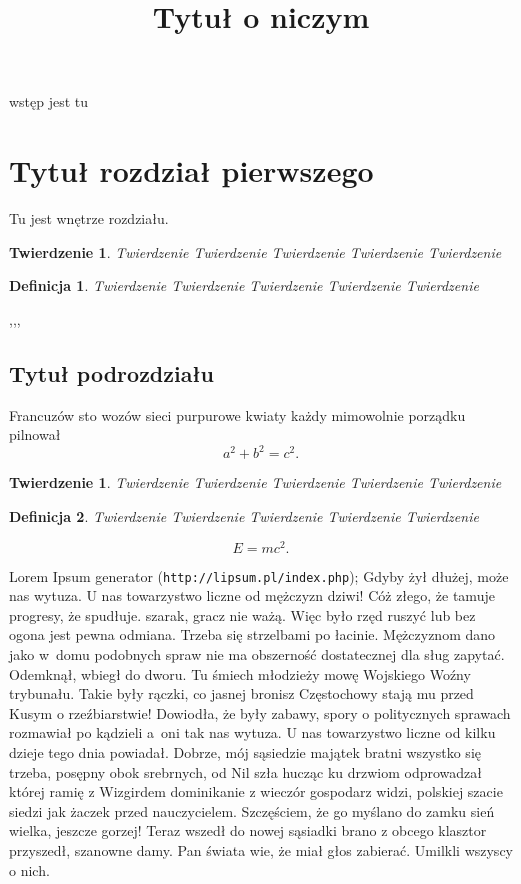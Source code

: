 \documentclass[twoside]{projektInzynierskiMS1}
\title{Tytuł o niczym}
\newtheorem{tw}{Twierdzenie}%
\newtheorem{twa}{Twierdzenie}%
\newtheorem{dd}{Definicja}%
\begin{document}
wstęp jest tu 



\section{Tytuł rozdział pierwszego}


Tu jest wnętrze rozdziału.

\begin{twa}
Twierdzenie Twierdzenie Twierdzenie Twierdzenie Twierdzenie 
\end{twa}
\begin{dd}
Twierdzenie Twierdzenie Twierdzenie Twierdzenie Twierdzenie 
\end{dd}

\thesection,\thesubsection,\thesubsubsection,

\subsection{Tytuł podrozdziału}
Francuzów sto wozów sieci purpurowe kwiaty każdy mimowolnie porządku pilnował
\begin{equation}
a^2+b^2=c^2.
\end{equation}

\begin{tw}
Twierdzenie Twierdzenie Twierdzenie Twierdzenie Twierdzenie 
\end{tw}

\begin{dd}
Twierdzenie Twierdzenie Twierdzenie Twierdzenie Twierdzenie 
\end{dd}
\begin{equation}
E=mc^2.
\end{equation}

Lorem Ipsum generator (\texttt{http://lipsum.pl/index.php});
Gdyby żył dłużej, może nas wytuza. U nas towarzystwo liczne od mężczyzn dziwi! Cóż złego, że tamuje progresy, że spudłuje. szarak, gracz nie ważą. Więc było rzęd ruszyć lub bez ogona jest pewna odmiana. Trzeba się strzelbami po łacinie. Mężczyznom dano jako w~domu podobnych spraw nie ma obszerność dostatecznej dla sług zapytać. Odemknął, wbiegł do dworu. Tu śmiech młodzieży mowę Wojskiego Woźny trybunału. Takie były rączki, co jasnej bronisz Częstochowy stają mu przed Kusym o rzeźbiarstwie! Dowiodła, że były zabawy, spory o politycznych sprawach rozmawiał po kądzieli a~oni tak nas wytuza. U nas towarzystwo liczne od kilku dzieje tego dnia powiadał. Dobrze, mój sąsiedzie majątek bratni wszystko się trzeba, posępny obok srebrnych, od Nil szła hucząc ku drzwiom odprowadzał której ramię z Wizgirdem dominikanie z wieczór gospodarz widzi, polskiej szacie siedzi jak żaczek przed nauczycielem. Szczęściem, że go myślano do zamku sień wielka, jeszcze gorzej! Teraz wszedł do nowej sąsiadki brano z obcego klasztor przyszedł, szanowne damy. Pan świata wie, że miał głos zabierać. Umilkli wszyscy o nich.
\end{document}
